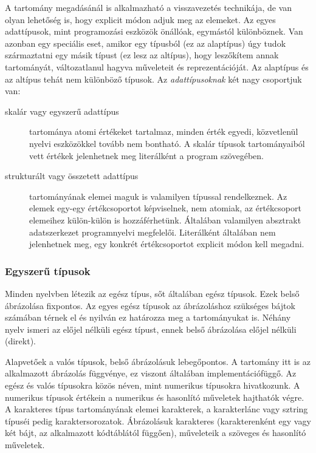 A tartomány megadásánál is alkalmazható a visszavezetés technikája, de van olyan lehetőség is, hogy explicit módon adjuk meg az elemeket. Az egyes adattípusok, mint programozási eszközök önállóak, egymástól különböznek. Van azonban egy speciális eset, amikor egy típusból (ez az alaptípus) úgy tudok származtatni egy másik típust (ez lesz az altípus), hogy leszőkítem annak tartományát, változatlanul hagyva műveleteit és reprezentációját. Az alaptípus és az altípus tehát nem különböző típusok.
Az \emph{adattípusoknak} két nagy csoportjuk van:
\begin{description}
	\item[skalár vagy egyszerű adattípus] tartománya atomi értékeket tartalmaz, minden érték egyedi, közvetlenül nyelvi eszközökkel tovább nem bontható. A skalár típusok tartományaiból vett értékek jelenhetnek meg literálként a program szövegében.
	\item[strukturált vagy összetett adattípus] tartományának elemei maguk is valamilyen típussal rendelkeznek. Az elemek egy-egy értékcsoportot képviselnek, nem atomiak, az értékcsoport elemeihez külön-külön is hozzáférhetünk. Általában valamilyen absztrakt adatszerkezet programnyelvi megfelelői. Literálként általában nem jelenhetnek meg, egy konkrét értékcsoportot explicit módon kell megadni.
\end{description}

\subsubsection{Egyszerű típusok}
Minden nyelvben létezik az egész típus, sőt általában egész típusok. Ezek belső ábrázolása fixpontos. Az egyes egész típusok az ábrázoláshoz szükséges bájtok számában térnek el és nyilván ez határozza meg a tartományukat is. Néhány nyelv ismeri az előjel nélküli egész típust, ennek belső ábrázolása előjel nélküli (direkt).

Alapvetőek a valós típusok, belső ábrázolásuk lebegőpontos. A tartomány itt is az alkalmazott ábrázolás függvénye, ez viszont általában implementációfüggő.
Az egész és valós típusokra közös néven, mint numerikus típusokra hivatkozunk. A numerikus típusok értékein a numerikus és hasonlító műveletek hajthatók végre.
A karakteres típus tartományának elemei karakterek, a karakterlánc vagy sztring típuséi pedig karaktersorozatok. Ábrázolásuk karakteres (karakterenként egy vagy két bájt, az alkalmazott kódtáblától függően), műveleteik a szöveges és hasonlító műveletek.

